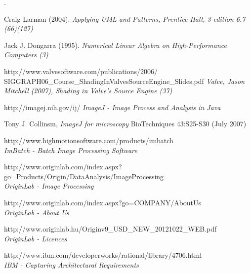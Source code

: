 \documentclass[a4paper,12pt,oneside]{report}
\begin{document}
.
%
%

\begin{thebibliography}{99}

		Craig Larman (2004). 
        {\em Applying UML and Patterns, Prentice Hall, 3 edition 6.7 (66)(127)\\}

		Jack J. Dongarra (1995). 
        {\em Numerical Linear Algebra on High-Performance Computers (3)\\}
        
		http://www.valvesoftware.com/publications/2006/\\SIGGRAPH06\_Course\_ShadingInValvesSourceEngine\_Slides.pdf
        {\em Valve, Jason Mitchell (2007), Shading in Valve’s Source Engine  (37) \\}     
        
        

        http://imagej.nih.gov/ij/
        {\em ImageJ - Image Process and Analysis in Java}
        
		Tony J. Collinsm,
        {\em ImageJ for microscopy}
        BioTechniques 43:S25-S30 (July 2007)

        http://www.highmotionsoftware.com/products/imbatch\\
        {\em ImBatch - Batch Image Processing Software}

		http://www.originlab.com/index.aspx?go=Products/Origin/DataAnalysis/ImageProcessing\\
        {\em OriginLab - Image Processing}
        
        
        http://www.originlab.com/index.aspx?go=COMPANY/AboutUs\\
        {\em OriginLab - About Us}

		http://www.originlab.hu/Originv9\_USD\_NEW\_20121022\_WEB.pdf\\
        {\em OriginLab - Licences}
        
        http://www.ibm.com/developerworks/rational/library/4706.html\\
        {\em IBM - Capturing Architectural Requirements}  



\end{thebibliography}
\end{document}
